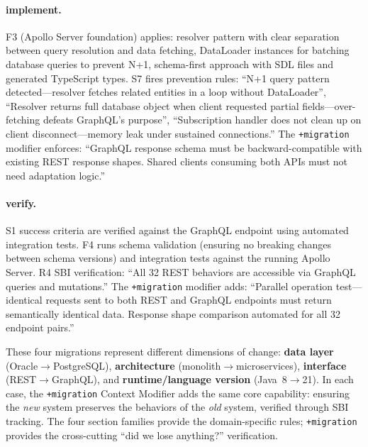 \documentclass[11pt,a4paper,openright,twoside]{report}
\begin{document}
\paragraph{implement.}
F3 (Apollo Server foundation) applies: resolver pattern with clear separation between query resolution and data fetching, DataLoader instances for batching database queries to prevent N+1, schema-first approach with SDL files and generated TypeScript types. S7 fires prevention rules: ``N+1 query pattern detected---resolver fetches related entities in a loop without DataLoader'', ``Resolver returns full database object when client requested partial fields---over-fetching defeats GraphQL's purpose'', ``Subscription handler does not clean up on client disconnect---memory leak under sustained connections.'' The \texttt{+migration} modifier enforces: ``GraphQL response schema must be backward-compatible with existing REST response shapes. Shared clients consuming both APIs must not need adaptation logic.''

\paragraph{verify.}
S1 success criteria are verified against the GraphQL endpoint using automated integration tests. F4 runs schema validation (ensuring no breaking changes between schema versions) and integration tests against the running Apollo Server. R4 SBI verification: ``All 32 REST behaviors are accessible via GraphQL queries and mutations.'' The \texttt{+migration} modifier adds: ``Parallel operation test---identical requests sent to both REST and GraphQL endpoints must return semantically identical data. Response shape comparison automated for all 32 endpoint pairs.''

\begin{tipbox}
These four migrations represent different dimensions of change: \textbf{data layer} (Oracle$\to$PostgreSQL), \textbf{architecture} (monolith$\to$microservices), \textbf{interface} (REST$\to$GraphQL), and \textbf{runtime/language version} (Java~8$\to$21). In each case, the \texttt{+migration} Context Modifier adds the same core capability: ensuring the \emph{new} system preserves the behaviors of the \emph{old} system, verified through SBI tracking. The four section families provide the domain-specific rules; \texttt{+migration} provides the cross-cutting ``did we lose anything?'' verification.
\end{tipbox}
\end{document}
